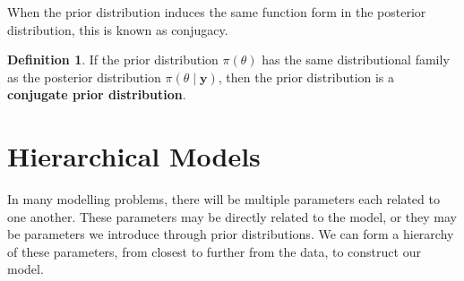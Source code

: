 \documentclass[
]{book}
\theoremstyle{definition}
\newtheorem{definition}{Definition}[chapter]
\theoremstyle{definition}
\theoremstyle{definition}
\theoremstyle{definition}
\theoremstyle{remark}
\begin{document}
When the prior distribution induces the same function form in the posterior distribution, this is known as conjugacy.

\begin{definition}
If the prior distribution \(\pi(\theta)\) has the same distributional family as the posterior distribution \(\pi(\theta \mid \boldsymbol{y})\), then the prior distribution is a \textbf{conjugate prior distribution}.
\end{definition}

\section{Hierarchical Models}\label{hierarchical-models}

In many modelling problems, there will be multiple parameters each related to one another. These parameters may be directly related to the model, or they may be parameters we introduce through prior distributions. We can form a hierarchy of these parameters, from closest to further from the data, to construct our model.
\end{document}
